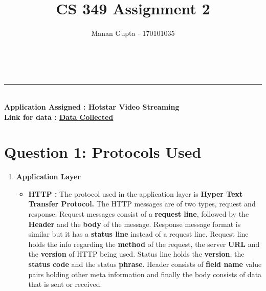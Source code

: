 \documentclass[a4paper,10pt]{article}
\title{CS 349 Assignment 2}
\author{Manan Gupta - 170101035}
\makeatletter
\renewcommand\maketitle{
	{\raggedright {
			\color{RoyalPurple}
		\begin{center}
			{\fontsize{22pt}{22pt} \bfseries \sffamily \@title } \qquad\qquad
			{\fontsize{22pt}{22pt} \bfseries \@author}\\[8ex]
\end{center}}} }
\makeatother
\begin{document}
\maketitle
\vspace{-1cm}
\hrule
\vspace{0.4cm}
\noindent
{\fontsize{18pt}{18pt} \bfseries \sffamily \color{RedViolet}\\Application Assigned : Hotstar Video Streaming\\
Link for data : \href{google.com}{Data Collected}
}
\vspace{-0.3cm}
\section*{Question 1: Protocols Used}
\begin{enumerate}
	\item \textbf{\color{Magenta} \large Application Layer}
	\begin{itemize}
		\item \textbf{HTTP :} The protocol used in the application layer is \textbf{Hyper Text Transfer Protocol.} The HTTP messages are of two types, request and response. Request messages consist of a \textbf{request line}, followed by the \textbf{Header} and the \textbf{body} of the message. Response message format is similar but it has a \textbf{status line} instead of a request line. Request line holds the info regarding the \textbf{method} of the request, the server \textbf{URL} and the \textbf{version} of HTTP being used. Status line holds the \textbf{version}, the \textbf{status code} and the status \textbf{phrase}. Header consists of \textbf{field name} value pairs holding other meta information and finally the body consists of data that is sent or received.
		\begin{figure}[h]
			\centering

\end{figure}
\end{itemize}
\end{enumerate}
\end{document}
